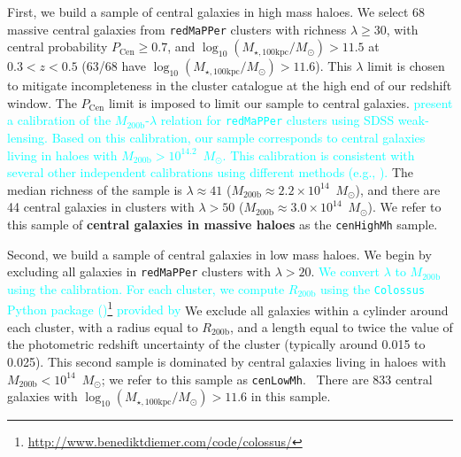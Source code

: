 \documentclass[a4paper,fleqn,usenatbib]{mnras}
\def\msun{$M_\odot$}
\def\redm{\texttt{redMaPPer}}
\def\rbcg{\texttt{cenHighMh}}
\def\nbcg{\texttt{cenLowMh}}
\def\mstar{{$M_{\star}$}}
\def\mhalo{{$M_{\mathrm{200b}}$}}
\def\logmtot{{$\log_{10} (M_{\star,100\mathrm{kpc}}/M_{\odot})$}}
\newcommand{\song}[1]{\textcolor{cyan}{#1}}
\begin{document}
 
    First, we build a sample of central galaxies in high mass haloes. We select 68 massive central galaxies from \redm{} clusters 
    with richness $\lambda \geq 30$, with central probability $P_{\mathrm{Cen}} \geq 0.7$, and \logmtot{}$ >11.5$ 
    at $0.3 < z < 0.5$ (63/68 have \logmtot{}$ >11.6$). 
    This $\lambda$ limit is chosen to mitigate incompleteness in the cluster catalogue
    at the high end of our redshift window. 
    The $P_{\mathrm{Cen}}$ limit is imposed to limit our sample to central galaxies. 
    \song{
    \citet{Simet2017} present a calibration of the \mhalo{}-$\lambda$ relation for \redm{} 
    clusters using SDSS weak-lensing. Based on this calibration, our sample corresponds to central galaxies living 
    in haloes with \mhalo{}$>10^{14.2}$~\msun{}. 
    This calibration is consistent with several other independent calibrations 
    using different methods (e.g., \citealt{Saro2015, Farahi2016, 
    Melchior2016, Murata2017}). 
    }
    The median richness of the sample is $\lambda \approx 41$ 
    (\mhalo{}$\approx 2.2 \times 10^{14}$~\msun{}), and there are 44 central galaxies in clusters with $\lambda>50$ 
    (\mhalo{}$\approx 3.0 \times 10^{14}$~\msun{}).
    We refer to this sample of \textbf{central galaxies in massive haloes} as 
    the \rbcg{} sample.
    
    Second, we build a sample of central galaxies in low mass haloes. We begin by excluding all galaxies in \redm{} clusters with $\lambda > 20$.
    \song{
    We convert $\lambda$ to $M_{\mathrm{200b}}$ using the \citet{Simet2017} calibration. For each cluster, we compute $R_{\mathrm{200b}}$ using the \texttt{Colossus} Python package 
    (\citealt{Colossus})\footnote{\url{http://www.benediktdiemer.com/code/colossus/}}
    provided by \citet{Diemer2015}} 
    We exclude all galaxies within a cylinder around each cluster, with a radius
    equal to $R_{\mathrm{200b}}$, and a length equal to twice the value of the 
    photometric redshift uncertainty of the cluster (typically around 0.015 to 0.025).
    This second sample is dominated by central galaxies living in haloes with
    $M_{\mathrm{200b}} < 10^{14}$~\msun{}; we refer to this sample as \nbcg{}. \
    There are 833 central galaxies with \logmtot{}$> 11.6$ in this sample.
\end{document}
